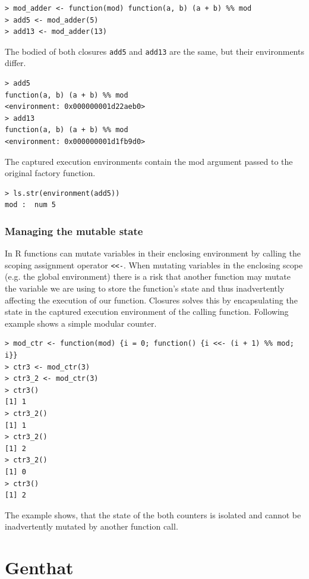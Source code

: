\documentclass[thesis=B,english]{FITthesis}[2012/10/20]
\begin{document}
\begin{verbatim}
> mod_adder <- function(mod) function(a, b) (a + b) %% mod
> add5 <- mod_adder(5)
> add13 <- mod_adder(13)
\end{verbatim}

The bodied of both closures \verb|add5| and \verb|add13| are the same, but their environments differ.

\begin{verbatim}
> add5
function(a, b) (a + b) %% mod
<environment: 0x000000001d22aeb0>
> add13
function(a, b) (a + b) %% mod
<environment: 0x000000001d1fb9d0>
\end{verbatim}

The captured execution environments contain the mod argument passed to the original factory function.

\begin{verbatim}
> ls.str(environment(add5))
mod :  num 5
\end{verbatim}

\subsection{Managing the mutable state}
In R functions can mutate variables in their enclosing environment by calling the scoping assignment operator \verb|<<-|. When mutating variables in the enclosing scope (e.g. the global environment) there is a risk that another function may mutate the variable we are using to store the function’s state and thus inadvertently affecting the execution of our function. Closures solves this by encapsulating the state in the captured execution environment of the calling function. Following example shows a simple modular counter.

\begin{verbatim}
> mod_ctr <- function(mod) {i = 0; function() {i <<- (i + 1) %% mod; i}}
> ctr3 <- mod_ctr(3)
> ctr3_2 <- mod_ctr(3)
> ctr3()
[1] 1
> ctr3_2()
[1] 1
> ctr3_2()
[1] 2
> ctr3_2()
[1] 0
> ctr3()
[1] 2
\end{verbatim}

The example shows, that the state of the both counters is isolated and cannot be inadvertently mutated by another function call.

\chapter{Genthat}
\end{document}
